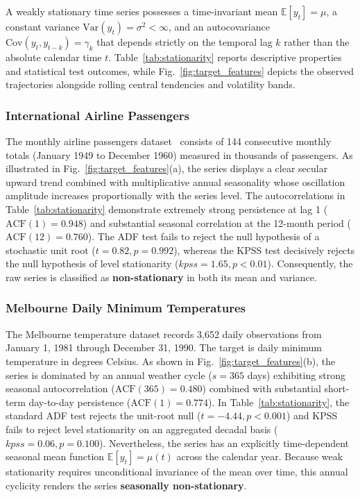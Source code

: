 

A weakly stationary time series possesses a time-invariant mean
$\mathbb{E}[y_t] = \mu$, a constant variance
$\mathrm{Var}(y_t) = \sigma^2 < \infty$, and an autocovariance
$\mathrm{Cov}(y_t, y_{t-k}) = \gamma_k$ that depends strictly on the temporal
lag $k$ rather than the absolute calendar time $t$. Table~\ref{tab:stationarity}
reports descriptive properties and statistical test outcomes, while
Fig.~\ref{fig:target_features} depicts the observed trajectories alongside
rolling central tendencies and volatility bands.

\subsubsection{International Airline Passengers}
The monthly airline passengers dataset~\cite{BoxJenkins1994} consists of 144
consecutive monthly totals (January 1949 to December 1960) measured in thousands
of passengers. As illustrated in Fig.~\ref{fig:target_features}(a), the series
displays a clear secular upward trend combined with multiplicative annual
seasonality whose oscillation amplitude increases proportionally with the series
level. The autocorrelations in Table~\ref{tab:stationarity} demonstrate
extremely strong persistence at lag 1 ($\text{ACF}(1) = 0.948$) and substantial
seasonal correlation at the 12-month period ($\text{ACF}(12) = 0.760$). The ADF
test fails to reject the null hypothesis of a stochastic unit root
($t = 0.82, p = 0.992$), whereas the KPSS test decisively rejects the null
hypothesis of level stationarity ($kpss = 1.65, p < 0.01$). Consequently, the
raw series is classified as \textbf{non-stationary} in both its mean and
variance.

\subsubsection{Melbourne Daily Minimum Temperatures}
The Melbourne temperature dataset records 3,652 daily observations from January
1, 1981 through December 31, 1990. The target is daily minimum temperature in
degrees Celsius. As shown in Fig.~\ref{fig:target_features}(b), the series is
dominated by an annual weather cycle ($s = 365$ days) exhibiting
strong seasonal autocorrelation ($\text{ACF}(365) = 0.480$) combined with
substantial short-term day-to-day persistence ($\text{ACF}(1) = 0.774$). In
Table~\ref{tab:stationarity}, the standard ADF test rejects the unit-root null
($t = -4.44, p < 0.001$) and KPSS fails to reject level stationarity on an
aggregated decadal basis ($kpss = 0.06, p = 0.100$). Nevertheless, the series
has an explicitly time-dependent seasonal mean function
$\mathbb{E}[y_t] = \mu(t)$ across the calendar year. Because weak stationarity
requires unconditional invariance of the mean over time, this annual cyclicity
renders the series \textbf{seasonally non-stationary}.

